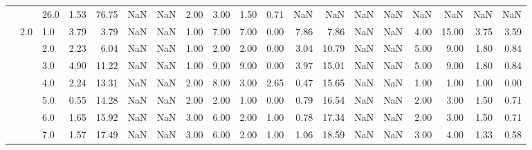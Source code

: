 \begin{tabular}{lllrrrrrrrrrrrrrrrr}
          &     & 26.0 &      1.53 &      76.75 &               NaN &                NaN &  2.00 &   3.00 &             1.50 &                         0.71 &       NaN &        NaN &               NaN &                NaN &   NaN &    NaN &              NaN &                          NaN \\
          & 2.0 & 1.0  &      3.79 &       3.79 &               NaN &                NaN &  1.00 &   7.00 &             7.00 &                         0.00 &      7.86 &       7.86 &               NaN &                NaN &  4.00 &  15.00 &             3.75 &                         3.59 \\
          &     & 2.0  &      2.23 &       6.04 &               NaN &                NaN &  1.00 &   2.00 &             2.00 &                         0.00 &      3.04 &      10.79 &               NaN &                NaN &  5.00 &   9.00 &             1.80 &                         0.84 \\
          &     & 3.0  &      4.90 &      11.22 &               NaN &                NaN &  1.00 &   9.00 &             9.00 &                         0.00 &      3.97 &      15.01 &               NaN &                NaN &  5.00 &   9.00 &             1.80 &                         0.84 \\
          &     & 4.0  &      2.24 &      13.31 &               NaN &                NaN &  2.00 &   8.00 &             3.00 &                         2.65 &      0.47 &      15.65 &               NaN &                NaN &  1.00 &   1.00 &             1.00 &                         0.00 \\
          &     & 5.0  &      0.55 &      14.28 &               NaN &                NaN &  2.00 &   2.00 &             1.00 &                         0.00 &      0.79 &      16.54 &               NaN &                NaN &  2.00 &   3.00 &             1.50 &                         0.71 \\
          &     & 6.0  &      1.65 &      15.92 &               NaN &                NaN &  3.00 &   6.00 &             2.00 &                         1.00 &      0.78 &      17.34 &               NaN &                NaN &  2.00 &   3.00 &             1.50 &                         0.71 \\
          &     & 7.0  &      1.57 &      17.49 &               NaN &                NaN &  3.00 &   6.00 &             2.00 &                         1.00 &      1.06 &      18.59 &               NaN &                NaN &  3.00 &   4.00 &             1.33 &                         0.58 \\

\end{tabular}
